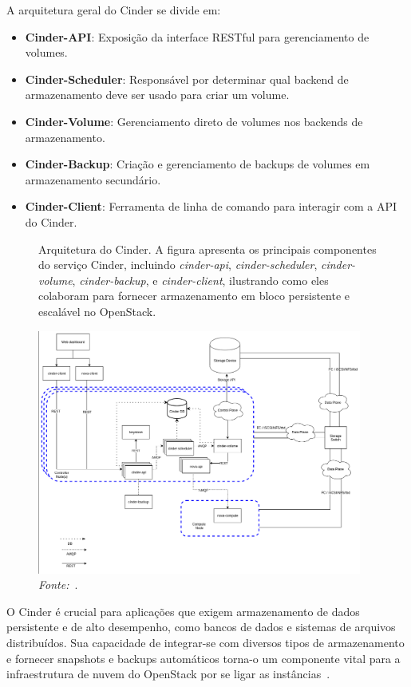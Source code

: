 A arquitetura geral do Cinder se divide em:

\begin{itemize}
    \item \textbf{Cinder-API}: Exposição da interface RESTful para gerenciamento de volumes.
    \item \textbf{Cinder-Scheduler}: Responsável por determinar qual backend de armazenamento deve ser usado para criar um volume.
    \item \textbf{Cinder-Volume}: Gerenciamento direto de volumes nos backends de armazenamento.
    \item \textbf{Cinder-Backup}: Criação e gerenciamento de backups de volumes em armazenamento    secundário.
    \item \textbf{Cinder-Client}: Ferramenta de linha de comando para interagir com a API do Cinder.
\end{itemize}


\begin{figure}[htbp]
  \centering
  \caption{Arquitetura do Cinder. A figura apresenta os principais componentes do serviço Cinder, incluindo \textit{cinder-api}, \textit{cinder-scheduler}, \textit{cinder-volume}, \textit{cinder-backup}, e \textit{cinder-client}, ilustrando como eles colaboram para fornecer armazenamento em bloco persistente e escalável no OpenStack.}
  \includegraphics[width=0.95\textwidth]{images/cinder_architecture.png}
  \caption*{\textit{Fonte:}~\citep{OpenStackCinder}.}
  \label{fig:cinder_architecture}
\end{figure}


O Cinder é crucial para aplicações que exigem armazenamento de dados persistente e de alto desempenho, como bancos de dados e sistemas de arquivos distribuídos. Sua capacidade de integrar-se com diversos tipos de armazenamento e fornecer snapshots e backups automáticos torna-o um componente vital para a infraestrutura de nuvem do OpenStack por se ligar as instâncias~\citep{OpenStackCinder}.


